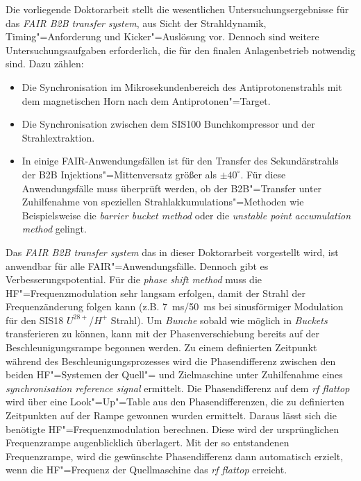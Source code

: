 Die vorliegende Doktorarbeit stellt die wesentlichen Untersuchungsergebnisse f\"ur das \textit{FAIR B2B transfer system}, aus Sicht der Strahldynamik, Timing"=Anforderung und Kicker"=Ausl\"osung vor. Dennoch sind weitere Untersuchungsaufgaben erforderlich, die f\"ur den finalen Anlagenbetrieb notwendig sind. Dazu z\"ahlen:
\begin{itemize}

\item Die Synchronisation im Mikrosekundenbereich des Antiprotonenstrahls mit dem magnetischen Horn nach dem Antiprotonen"=Target.
\item Die Synchronisation zwischen dem SIS100 Bunchkompressor und der Strahlextraktion.
\item In einige FAIR-Anwendungsf\"allen ist f\"ur den Transfer des Sekund\"arstrahls der B2B Injektions"=Mittenversatz gr\"o\ss{}er als $\pm40^\circ$.  F\"ur diese Anwendungsf\"alle muss \"uberpr\"uft werden, ob der B2B"=Transfer unter Zuhilfenahme von speziellen Strahlakkumulations"=Methoden wie Beispielsweise die \textit{barrier bucket method} oder die \textit{unstable point accumulation method} gelingt.
\end{itemize}

Das \textit{FAIR B2B transfer system} das in dieser Doktorarbeit vorgestellt wird, ist anwendbar f\"ur alle FAIR"=Anwendungsf\"alle. Dennoch gibt es Verbesserungspotential. F\"ur die \textit{phase shift method} muss die HF"=Frequenzmodulation sehr langsam erfolgen, damit der Strahl der Frequenz\"anderung folgen kann (z.B. \SI{7}{\ms}/\SI{50}{\ms} bei sinusf\"ormiger Modulation für den SIS18 $U^\mathit{28+}$/$H^\mathit{+}$ Strahl). Um \textit{Bunche} sobald wie m\"oglich in \textit{Buckets} transferieren zu k\"onnen, kann mit der Phasenverschiebung bereits auf der Beschleunigungsrampe begonnen werden. Zu einem definierten Zeitpunkt w\"ahrend des Beschleunigungsprozesses wird die Phasendifferenz zwischen den beiden HF"=Systemen der Quell"= und Zielmaschine unter Zuhilfenahme eines \textit{synchronisation reference signal} ermittelt. Die Phasendifferenz auf dem \textit{rf flattop} wird \"uber eine Look"=Up"=Table aus den Phasendifferenzen, die zu definierten Zeitpunkten auf der Rampe gewonnen wurden ermittelt. Daraus l\"asst sich die ben\"otigte HF"=Frequenzmodulation berechnen. Diese wird der urspr\"unglichen Frequenzrampe augenblicklich \"uberlagert. Mit der so entstandenen Frequenzrampe, wird die gew\"unschte Phasendifferenz dann automatisch erzielt, wenn die HF"=Frequenz der Quellmaschine das \textit{rf flattop} erreicht.